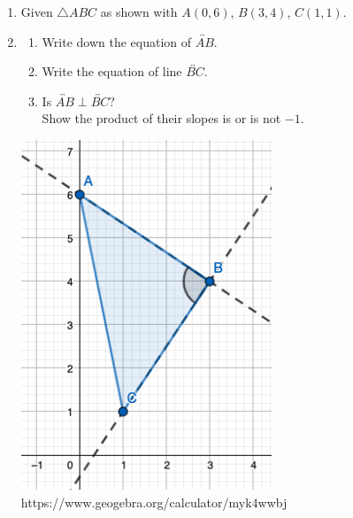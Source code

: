 \documentclass[12pt, twoside]{article}
\begin{document}
\begin{enumerate}
\newpage
\item Given $\triangle ABC$ as shown with $A(0,6)$, $B(3,4)$, $C(1,1)$.
\item \begin{multicols}{2}
  \begin{enumerate}
    \item Write down the equation of $\overleftrightarrow{AB}$.
    \item Write the equation of line $\overleftrightarrow{BC}$.
    \item Is $\overleftrightarrow{AB} \perp \overleftrightarrow{BC}$? \\[1cm]
    Show the product of their slopes is or is not $-1$. \\[3cm]
    \end{enumerate}
\columnbreak
    \includegraphics[width=7.5cm]{6-16-10-triangle.png}
    https://www.geogebra.org/calculator/myk4wwbj
\end{multicols}


\end{enumerate}
\end{document}
